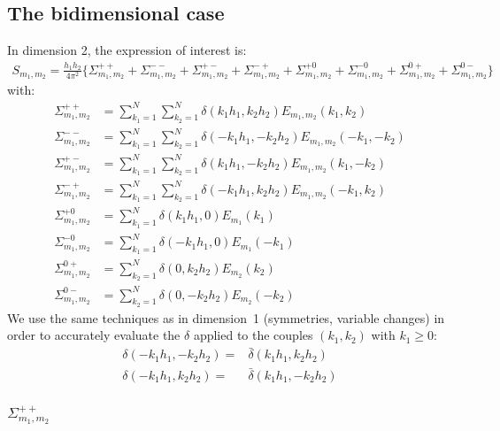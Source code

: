 \subsection{The bidimensional case}
In dimension 2, the expression of interest is:
\begin{align}
S_{m_1,m_2}=\frac{h_1h_2}{4\pi^2}\Big\{
  \Sigma_{m_1,m_2}^{++} + \Sigma_{m_1,m_2}^{--} + \Sigma_{m_1,m_2}^{+-} + \Sigma_{m_1,m_2}^{-+} +
  \Sigma_{m_1,m_2}^{+0} + \Sigma_{m_1,m_2}^{-0} + \Sigma_{m_1,m_2}^{0+} + \Sigma_{m_1,m_2}^{0-}
\Big\}
\end{align}
with:
\begin{align}
\Sigma_{m_1,m_2}^{++}&=\sum_{k_1=1}^{N}\sum_{k_2=1}^{N}\delta\left(k_1h_1,k_2h_2\right)E_{m_1,m_2}(k_1,k_2)\\
\Sigma_{m_1,m_2}^{--}&=\sum_{k_1=1}^{N}\sum_{k_2=1}^{N}\delta\left(-k_1h_1,-k_2h_2\right)E_{m_1,m_2}(-k_1,-k_2)\\
\Sigma_{m_1,m_2}^{+-}&=\sum_{k_1=1}^{N}\sum_{k_2=1}^{N}\delta\left(k_1h_1,-k_2h_2\right)E_{m_1,m_2}(k_1,-k_2)\\
\Sigma_{m_1,m_2}^{-+}&=\sum_{k_1=1}^{N}\sum_{k_2=1}^{N}\delta\left(-k_1h_1,k_2h_2\right)E_{m_1,m_2}(-k_1,k_2)\\
\Sigma_{m_1,m_2}^{+0}&=\sum_{k_1=1}^{N}\delta(k_1h_1,0)E_{m_1}(k_1)\\
\Sigma_{m_1,m_2}^{-0}&=\sum_{k_1=1}^{N}\delta(-k_1h_1,0)E_{m_1}(-k_1)\\
\Sigma_{m_1,m_2}^{0+}&=\sum_{k_2=1}^{N}\delta(0,k_2h_2)E_{m_2}(k_2)\\
\Sigma_{m_1,m_2}^{0-}&=\sum_{k_2=1}^{N}\delta(0,-k_2h_2)E_{m_2}(-k_2)
\end{align}
We use the same techniques as in dimension~1 (symmetries, variable changes) in order to accurately evaluate the $\delta$ applied to the couples $(k_1, k_2)$ with $k_1\geq 0$:
\begin{align}
\delta\left(-k_1h_1,-k_2h_2\right)=&\bar{\delta}\left(k_1h_1,k_2h_2\right)\\
\delta\left(-k_1h_1, k_2h_2\right)=&\bar{\delta}\left(k_1h_1,-k_2h_2\right)
\end{align}

\subsubsection{$\Sigma_{m_1,m_2}^{++}$}

